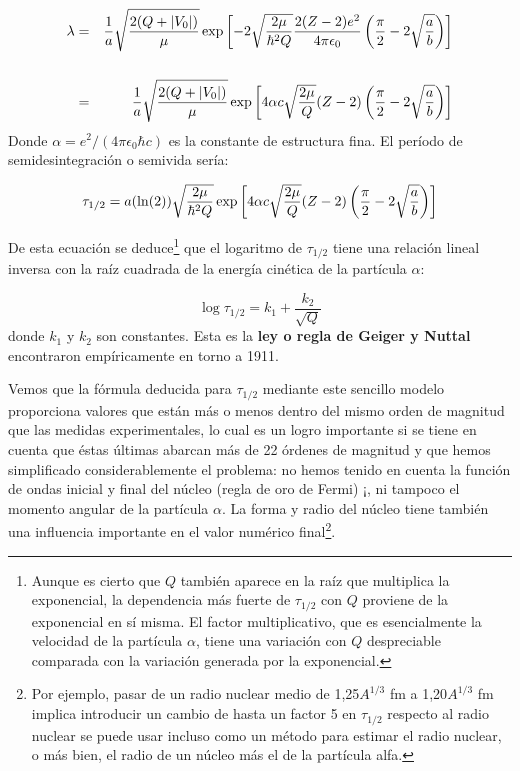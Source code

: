 \begin{eqnarray}
    \lambda & = & \frac{1}{a} \sqrt{\frac{2(Q+|V_0|)}{\mu}} \exp \left[ -2  \sqrt{\frac{2 \mu}{\hbar^2 Q}} \frac{2(Z-2)e^2}{4 \pi \epsilon_0} \left( \frac{\pi}{2}-2\sqrt{\frac{a}{b}} \right) \right] \\ \\
            & = & \frac{1}{a} \sqrt{\frac{2(Q+|V_0|)}{\mu}}  \exp \left[ 4 \alpha c \sqrt{\frac{2 \mu}{Q}} (Z-2) \left( \frac{\pi}{2}-2\sqrt{\frac{a}{b}} \right) \right]
\end{eqnarray}
Donde $\alpha=e^2/(4 \pi \epsilon_0 \hbar c)$ es la constante de estructura fina. El período de semidesintegración o semivida sería:
\begin{mybox}
\begin{equation}
    \tau_{1/2} = a (\ln (2)) \sqrt{\frac{2\mu}{\hbar^2Q}} \exp \left[ 4 \alpha c \sqrt{\frac{2 \mu}{Q}} (Z-2) \left( \frac{\pi}{2}-2\sqrt{\frac{a}{b}} \right) \right]
\end{equation}
\end{mybox}
De esta ecuación se deduce\footnote{Aunque es cierto que $Q$ también aparece en la raíz que multiplica la exponencial, la dependencia más fuerte de $\tau_{1/2}$ con $Q$ proviene de la exponencial en sí misma. El factor multiplicativo, que es esencialmente la velocidad de la partícula $\alpha$, tiene una variación con $Q$ despreciable comparada con la variación generada por la exponencial.} que el logaritmo de $\tau_{1/2}$ tiene una relación lineal inversa con la raíz cuadrada de la energía cinética de la partícula $\alpha$:

\begin{equation}
    \log \tau_{1/2} = k_1 + \frac{k_2}{\sqrt{Q}}
\end{equation}
donde $k_1$ y $k_2$ son constantes. Esta es la \textbf{ley o regla de Geiger y Nuttal} encontraron empíricamente en torno a 1911. %

Vemos que la fórmula deducida para $\tau_{1/2}$ mediante este sencillo modelo proporciona valores que están más o menos dentro del mismo orden de magnitud que las medidas experimentales, lo cual es un logro importante si se tiene en cuenta que éstas últimas abarcan más de 22 órdenes de magnitud y que hemos simplificado considerablemente el problema: no hemos tenido en cuenta la función de ondas inicial y final del núcleo (regla de oro de Fermi) ¡, ni tampoco el momento angular de la partícula $\alpha$. La forma y radio del núcleo tiene también una influencia importante en el valor numérico final\footnote{Por ejemplo, pasar de un radio nuclear medio de 1,25$A^{1/3}$ fm a 1,20$A^{1/3}$ fm implica introducir un cambio de hasta un factor 5 en $\tau_{1/2}$ respecto al radio nuclear se puede usar incluso como un método para estimar el radio nuclear, o más bien, el radio de un núcleo más el de la partícula alfa.}.

